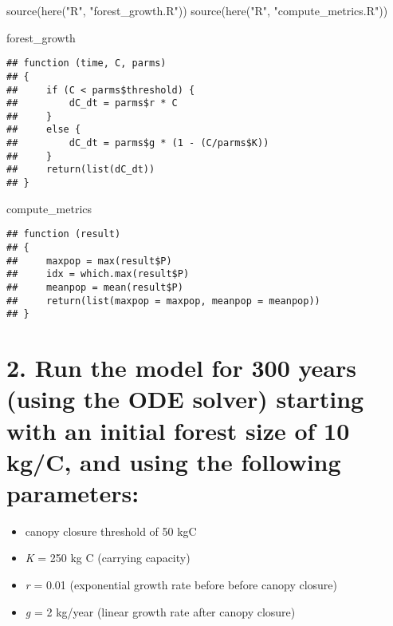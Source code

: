 \documentclass[
]{article}
\newenvironment{Shaded}{\begin{snugshade}}{\end{snugshade}}
\newcommand{\FunctionTok}[1]{\textcolor[rgb]{0.00,0.00,0.00}{#1}}
\newcommand{\NormalTok}[1]{#1}
\newcommand{\StringTok}[1]{\textcolor[rgb]{0.31,0.60,0.02}{#1}}
\begin{document}
\begin{Shaded}
\begin{Highlighting}[]
\FunctionTok{source}\NormalTok{(}\FunctionTok{here}\NormalTok{(}\StringTok{"R"}\NormalTok{, }\StringTok{"forest\_growth.R"}\NormalTok{))}
\FunctionTok{source}\NormalTok{(}\FunctionTok{here}\NormalTok{(}\StringTok{"R"}\NormalTok{, }\StringTok{"compute\_metrics.R"}\NormalTok{))}

\NormalTok{forest\_growth}
\end{Highlighting}
\end{Shaded}

\begin{verbatim}
## function (time, C, parms) 
## {
##     if (C < parms$threshold) {
##         dC_dt = parms$r * C
##     }
##     else {
##         dC_dt = parms$g * (1 - (C/parms$K))
##     }
##     return(list(dC_dt))
## }
\end{verbatim}

\begin{Shaded}
\begin{Highlighting}[]
\NormalTok{compute\_metrics}
\end{Highlighting}
\end{Shaded}

\begin{verbatim}
## function (result) 
## {
##     maxpop = max(result$P)
##     idx = which.max(result$P)
##     meanpop = mean(result$P)
##     return(list(maxpop = maxpop, meanpop = meanpop))
## }
\end{verbatim}

\hypertarget{run-the-model-for-300-years-using-the-ode-solver-starting-with-an-initial-forest-size-of-10-kgc-and-using-the-following-parameters}{%
\section{2. Run the model for 300 years (using the ODE solver) starting
with an initial forest size of 10 kg/C, and using the following
parameters:}\label{run-the-model-for-300-years-using-the-ode-solver-starting-with-an-initial-forest-size-of-10-kgc-and-using-the-following-parameters}}

\begin{itemize}
\item
  canopy closure threshold of 50 kgC
\item
  \emph{K} = 250 kg C (carrying capacity)
\item
  \emph{r} = 0.01 (exponential growth rate before before canopy closure)
\item
  \emph{g} = 2 kg/year (linear growth rate after canopy closure)
\end{itemize}
\end{document}
